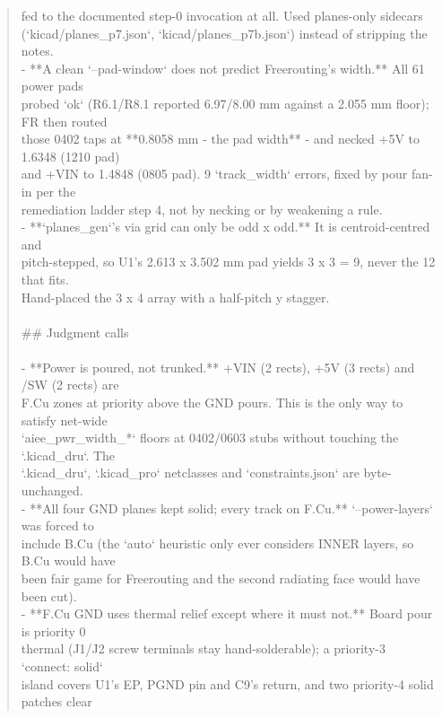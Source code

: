 \documentclass[11pt,a4paper]{article}
\begin{document}
\begin{quote}
  fed to the documented step-0 invocation at all. Used planes-only sidecars\\
  (`kicad/planes\_p7.json`, `kicad/planes\_p7b.json`) instead of stripping the notes.\\
- {*}{*}A clean `--pad-window` does not predict Freerouting's width.{*}{*} All 61 power pads\\
  probed `ok` (R6.1/R8.1 reported 6.97/8.00 mm against a 2.055 mm floor); FR then routed\\
  those 0402 taps at {*}{*}0.8058 mm - the pad width{*}{*} - and necked +5V to 1.6348 (1210 pad)\\
  and +VIN to 1.4848 (0805 pad). 9 `track\_width` errors, fixed by pour fan-in per the\\
  remediation ladder step 4, not by necking or by weakening a rule.\\
- {*}{*}`planes\_gen`'s via grid can only be odd x odd.{*}{*} It is centroid-centred and\\
  pitch-stepped, so U1's 2.613 x 3.502 mm pad yields 3 x 3 = 9, never the 12 that fits.\\
  Hand-placed the 3 x 4 array with a half-pitch y stagger.\\
~\\
\#\# Judgment calls\\
~\\
- {*}{*}Power is poured, not trunked.{*}{*} +VIN (2 rects), +5V (3 rects) and /SW (2 rects) are\\
  F.Cu zones at priority above the GND pours. This is the only way to satisfy net-wide\\
  `aiee\_pwr\_width\_{*}` floors at 0402/0603 stubs without touching the `.kicad\_dru`. The\\
  `.kicad\_dru`, `.kicad\_pro` netclasses and `constraints.json` are byte-unchanged.\\
- {*}{*}All four GND planes kept solid; every track on F.Cu.{*}{*} `--power-layers` was forced to\\
  include B.Cu (the `auto` heuristic only ever considers INNER layers, so B.Cu would have\\
  been fair game for Freerouting and the second radiating face would have been cut).\\
- {*}{*}F.Cu GND uses thermal relief except where it must not.{*}{*} Board pour is priority 0\\
  thermal (J1/J2 screw terminals stay hand-solderable); a priority-3 `connect: solid`\\
  island covers U1's EP, PGND pin and C9's return, and two priority-4 solid patches clear\\

\end{quote}
\end{document}
